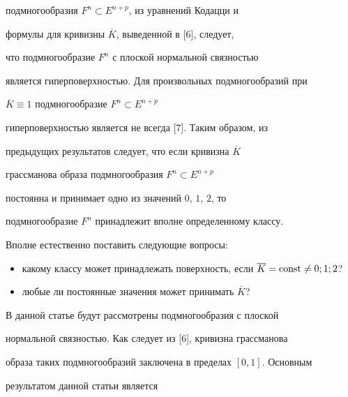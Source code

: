 подмногообразия $F^{n}\subset E^{n+p}$, из уравнений Кодацци и


формулы  для кривизны $\overline K$, выведенной в [6], следует,


что подмногообразие  $F^{n}$ с плоской нормальной связностью


является гиперповерхностью. Для произвольных подмногообразий при


$\overline K \equiv 1$ подмногообразие $F^{n}\subset E^{n+p}$


гиперповерхностью является не всегда [7]. Таким образом, из


предыдущих результатов следует, что если кривизна $\overline K$


грассманова образа подмногообразия $F^{n}\subset E^{n+p}$


постоянна и принимает одно из значений $0$, $1$, $2$, то


подмногообразие $F^{n}$ принадлежит вполне определенному классу.





Вполне естественно поставить следующие вопросы:


\begin{itemize}


\item[а)] какому классу может принадлежать поверхность, если $\overline


K=\const \neq 0; 1; 2$?


\item[б)] любые ли постоянные значения может принимать $\overline K$?


\end{itemize}





В данной статье будут рассмотрены подмногообразия с плоской


нормальной связностью. Как следует из [6], кривизна грассманова


образа таких подмногообразий заключена в пределах $[0,1]$. Основным


результатом данной статьи является





